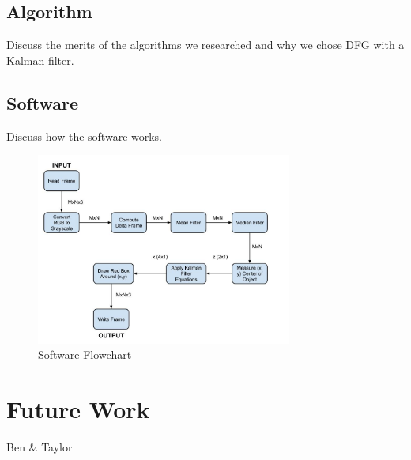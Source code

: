 \documentclass[12pt]{article} %
\begin{document}
\subsection{Algorithm}
Discuss the merits of the algorithms we researched and why we chose DFG with a Kalman filter.
\subsection{Software}
Discuss how the software works.
\begin{figure}[h]
\centering
\includegraphics[width=0.75\textwidth]{./images/software_flow.jpg}
\caption{Software Flowchart}
\label{fig:sw_flow}    
\end{figure}
\section{Future Work}
Ben \& Taylor
\end{document}
